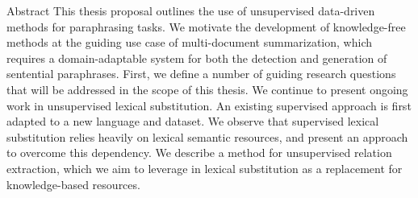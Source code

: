 Abstract This thesis proposal outlines the use of unsupervised data-driven methods for paraphrasing tasks. We motivate the development of knowledge-free methods at the guiding use case of multi-document summarization, which requires a domain-adaptable system for both the detection and generation of sentential paraphrases. First, we define a number of guiding research questions that will be addressed in the scope of this thesis. We continue to present ongoing work in unsupervised lexical substitution. An existing supervised approach is first adapted to a new language and dataset. We observe that supervised lexical substitution relies heavily on lexical semantic resources, and present an approach to overcome this dependency. We describe a method for unsupervised relation extraction, which we aim to leverage in lexical substitution as a replacement for knowledge-based resources.
